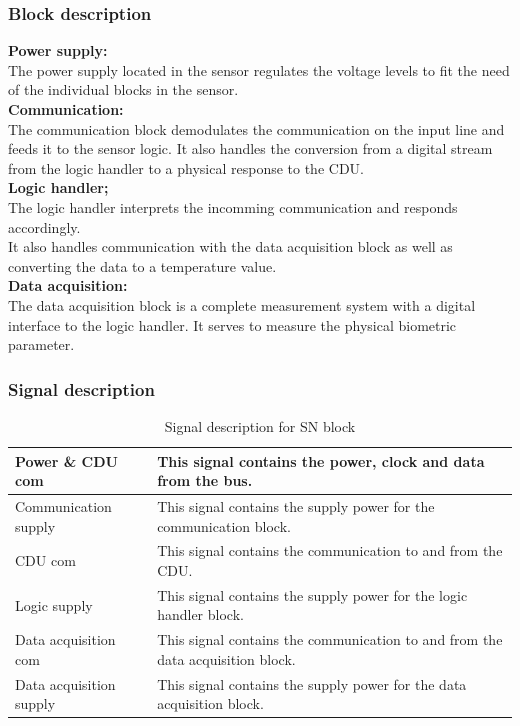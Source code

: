 \subsubsection{Block description}

\textbf{Power supply:}\\
The power supply located in the sensor regulates the voltage levels to fit the need of the individual blocks in the sensor.\\

\textbf{Communication:}\\
The communication block demodulates the communication on the input line and feeds it to the sensor logic. It also handles the conversion from a digital stream from the logic handler to a physical response to the CDU.\\

\textbf{Logic handler;}\\
The logic handler interprets the incomming communication and responds accordingly.\\
It also handles communication with the data acquisition block as well as converting the data to a temperature value.\\

\textbf{Data acquisition:}\\
The data acquisition block is a complete measurement system with a digital interface to the logic handler. It serves to measure the physical biometric parameter.\\

\subsubsection{Signal description}
\begin{table}[H]
	\centering
    \begin{tabular}{|l|p{9cm}|}
    \hline
    Power \& CDU com & This signal contains the power, clock and data from the bus. \\
    \hline
   	Communication supply & This signal contains the supply power for the communication block. \\
    \hline
    CDU com & This signal contains the communication to and from the CDU. \\
    \hline
    Logic supply & This signal contains the supply power for the logic handler block. \\
    \hline
    Data acquisition com & This signal contains the communication to and from the data acquisition block. \\
    \hline
    Data acquisition supply & This signal contains the supply power for the data acquisition block. \\
    \hline
    \end{tabular}
    \caption{Signal description for SN block}
    \label{SNsignaldes}
\end{table}

